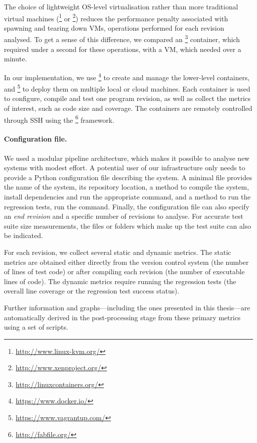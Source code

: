 The choice of lightweight OS-level virtualisation rather than more traditional
virtual machines (\eg \kvm\footnote{\url{http://www.linux-kvm.org/}} or
\xen\footnote{\url{http://www.xenproject.org/}}) reduces the performance
penalty associated with spawning and tearing down VMs, operations performed for
each revision analysed.  To get a sense of this difference, we compared an
\lxc\footnote{\url{http://linuxcontainers.org/}} container, which required
under a second for these operations, with a \xen VM, which needed over a
minute.

In our implementation, we use \docker\footnote{\url{https://www.docker.io/}} to
create and manage the lower-level \lxc containers, and
\vagrant\footnote{\url{https://www.vagrantup.com/}} to deploy them on multiple
local or cloud machines.  Each container is used to configure, compile and test
one program revision, as well as collect the metrics of interest, such as code
size and coverage. The containers are remotely controlled through SSH using the
\fabric\footnote{\url{http://fabfile.org/}} framework.

\paragraph{Configuration file.} We used a modular pipeline architecture, which
makes it possible to analyse new systems with modest effort. A potential user
of our infrastructure only needs to provide a Python configuration file
describing the system. A minimal file provides the name of the system, its \git
repository location, a method to compile the system, \eg install dependencies
and run the appropriate  command, and a method to run the regression
tests, \eg run the  command.  Finally, the configuration file
can also specify an {\em end revision} and a specific number of revisions to
analyse.  For accurate test suite size measurements, the files or folders which
make up the test suite can also be indicated.

For each revision, we collect several static and dynamic metrics.  The static
metrics are obtained either directly from the version control system (\eg the
number of lines of test code) or after compiling each revision (\eg the number
of executable lines of code).  The dynamic metrics require running the
regression tests (\eg the overall line coverage or the regression test success
status).

Further information and graphs---including the ones presented in this
thesis---are automatically derived in the post-processing stage from these
primary metrics using a set of scripts.

